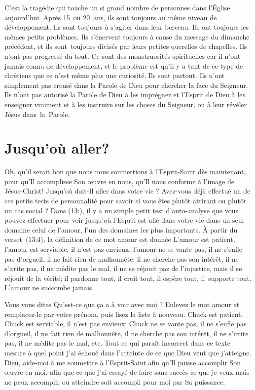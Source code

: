 C'est la tragédie qui touche un si grand nombre de personnes
 dans l'Église aujourd'hui. Après 15~ou 20~ans,
 ils sont toujours au même niveau de développement.
 Ils sont toujours à s'agiter dans leur berceau.
 Ils ont toujours les mêmes petits problèmes.
 Ils s'éner\-vent toujours à cause du message du dimanche précédent,
 et ils sont~toujours divisés par leurs petites querelles de chapelles.
 Ils n'ont pas progressé du tout. Ce sont des monstruosités spirituelles
 car il n'ont jamais connu de développement, et le problème est qu'il y a
 tant de ce type de chrétiens que ce n'est même plus une curiosité.
 Ils sont partout. Ils n'ont simplement pas creusé dans la Parole de Dieu
 pour chercher la face du Seigneur. Ils n'ont pas autorisé la Parole de Dieu
 à les imprégner et l'Esprit de Dieu à les enseigner vraiment et
 à les instruire sur les choses du Seigneur,
 ou à leur révéler Jésus dans~la~Parole.


\section{Jusqu'o\`u aller?}

Oh, qu'il serait bon que nous nous soumettions à l'Esprit-Saint
 dès maintenant, pour qu'Il accomplisse Son œuvre en nous,
 qu'Il nous conforme à l'image de Jésus-Christ!
 Jusqu'où doit-Il aller dans votre vie ?
 Avez-vous déjà effectué un de ces petits tests de personnalité pour savoir
 si vous êtes plutôt attirant ou plutôt un cas social ?
 Dans (13:), il y a un simple petit test d'auto-analyse
 que vous pouvez effectuer pour voir jusqu'où l'Esprit est allé
 dans votre vie dans un seul domaine\frcolon{} celui de l'amour,
 l'un des domaines les plus importants.
 À partir du verset~(13:4), la définition
 de ce mot \Og amour \Fg{} est donnée\frcolon{}
 \Og L'amour est patient, l'amour est serviable, il n'est pas envieux;
 l'amour ne se vante pas, il ne s'enfle pas d'orgueil,
 il ne fait rien de malhonnête, il ne cherche pas son intérêt,
 il ne s'irrite pas, il ne médite pas le mal, il ne se réjouit pas
 de l'injustice, mais il se réjouit de la vérité; il pardonne tout,
 il croit tout, il espère tout, il~supporte tout.
 L'amour ne succombe jamais. \Fg{}

Vous vous dites\frcolon{}
 \Og Qu'est-ce que ça a à voir avec moi ? \Fg{}
 Enlevez le mot \Og amour \Fg{} et remplacez-le par votre prénom,
 puis lisez la liste à nouveau.
 \Og Chuck est patient, Chuck est serviable, il n'est pas envieux;
 Chuck ne se vante pas, il ne s'enfle pas d'orgueil, il ne fait rien
 de malhonnête, il ne cherche pas son intérêt, il ne s'irrite pas,
 il ne médite pas le mal, etc. \Fg{}
 Tout ce qui paraît incorrect dans ce texte mesure à quel point j'ai échoué
 dans l'atteinte de ce que Dieu veut que j'atteigne.
 Dieu, aide-moi à me soumettre à l'Esprit-Saint afin qu'Il puisse accomplir
 Son œuvre en moi, afin que ce que j'ai essayé de faire sans succès
 \ocadr ce que je veux mais ne peux accomplir ou atteindre \fcadr
 soit accompli pour moi par Sa puissance.
\thispagestyle{chapterend}
